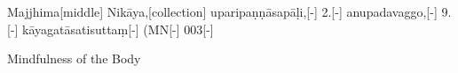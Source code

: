 
\begin{samepage}
\begingl[glneveryline={\PaliGlossA,\PaliGlossB}]
Majjhima[middle] Nikāya,[collection] uparipaṇṇāsapāḷi,[-] 2.[-] anupadavaggo,[-] 9.[-] kāyagatāsatisuttaṃ[-] (MN[-] 003[-]
\endgl
\nopagebreak
\linespread{0.5}
\begin{spacin}{0.2}
{\PaliGlossFT Mindfulness of the Body}
\end{spacin}
\vskip 12pt
\end{samepage}

